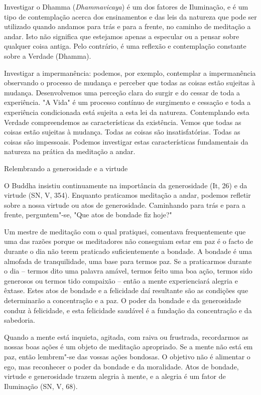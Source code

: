 Investigar o Dhamma (\emph{Dhammavicaya}) é um dos fatores de
Iluminação, e é um tipo de contemplação acerca dos ensinamentos e das
leis da natureza que pode ser utilizado quando andamos para trás e para
a frente, no caminho de meditação a andar. Isto não significa que
estejamos apenas a especular ou a pensar sobre qualquer coisa antiga.
Pelo contrário, é uma reflexão e contemplação constante sobre a Verdade
(Dhamma).

Investigar a impermanência: podemos, por exemplo, contemplar a
impermanência observando o processo de mudança e perceber que todas as
coisas estão sujeitas à mudança. Desenvolvemos uma perceção clara do
surgir e do cessar de toda a experiência. "A Vida" é um processo
contínuo de surgimento e cessação e toda a experiência condicionada está
sujeita a esta lei da natureza. Contemplando esta Verdade compreendemos
as características da existência. Vemos que todas as coisas estão
sujeitas à mudança. Todas as coisas são insatisfatórias. Todas as coisas
são impessoais. Podemos investigar estas características fundamentais da
natureza na prática da meditação a andar.

\begin{siderule-quote}
  Relembrando a generosidade e a virtude
\end{siderule-quote}

O Buddha insistiu continuamente na importância da generosidade (It, 26)
e da virtude (SN, V, 354). Enquanto praticamos meditação a andar,
podemos refletir sobre a nossa virtude ou atos de generosidade.
Caminhando para trás e para a frente, perguntem"-se, "Que atos de bondade
fiz hoje?"

Um mestre de meditação com o qual pratiquei, comentava frequentemente
que uma das razões porque os meditadores não conseguiam estar em paz é o
facto de durante o dia não terem praticado suficientemente a bondade. A
bondade é uma almofada de tranquilidade, uma base para termos paz. Se a
praticarmos durante o dia -- termos dito uma palavra amável, termos
feito uma boa ação, termos sido generosos ou termos tido compaixão --
então a mente experienciará alegria e êxtase. Estes atos de bondade e a
felicidade daí resultante são as condições que determinarão a
concentração e a paz. O poder da bondade e da generosidade conduz à
felicidade, e esta felicidade saudável é a fundação da concentração e da
sabedoria.

Quando a mente está inquieta, agitada, com raiva ou frustrada,
recordarmos as nossas boas ações é um objeto de meditação apropriado. Se
a mente não está em paz, então lembrem"-se das vossas ações bondosas. O
objetivo não é alimentar o ego, mas reconhecer o poder da bondade e da
moralidade. Atos de bondade, virtude e generosidade trazem alegria à
mente, e a alegria é um fator de Iluminação (SN, V, 68).

